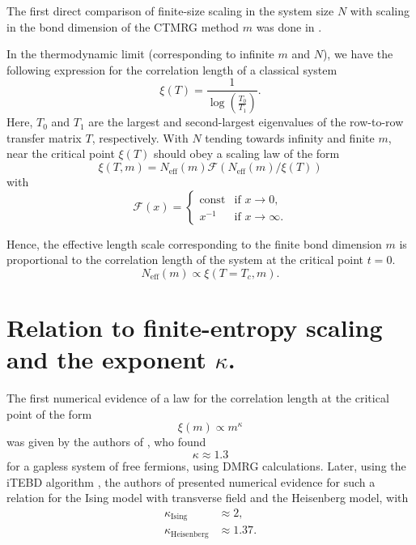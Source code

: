 The first direct comparison of finite-size scaling in the system size $N$ with scaling in
the bond dimension of the CTMRG method $m$ was done
in \cite{nishino1996numerical}.

In the thermodynamic limit (corresponding to infinite $m$ and $N$), we have the following
expression for the correlation length of a classical system
\cite{baxter1982exactly_correlation_length}
\begin{equation}\label{eq:correlation_length_row_to_row_transfer_matrix}
  \xi(T) = \frac{1}{\log\left(\frac{T_0}{T_1}\right)}.
\end{equation}
Here, $T_0$ and $T_1$ are the largest and second-largest eigenvalues of the row-to-row
transfer matrix $T$, respectively. With $N$ tending towards infinity and finite $m$, near
the critical point $\xi(T)$ should obey a scaling law of the form
\begin{equation}
  \xi(T, m) = N_{\text{eff}}(m) \mathcal{F}(N_{\text{eff}}(m) / \xi(T))
\end{equation}
with
\begin{equation}
  \mathcal{F}(x) = \begin{cases}
      \text{const} & \text{if } x \to 0, \\
      x^{-1} & \text{if } x \to \infty.
    \end{cases}
\end{equation}

Hence, the effective length scale corresponding to the finite bond dimension $m$ is
proportional to the correlation length of the system at the critical point $t = 0$.
\begin{equation}
  N_{\text{eff}}(m) \propto \xi(T = T_c, m).
\end{equation}


\section{Relation to finite-entropy scaling and the exponent $\kappa$.}


The first numerical evidence of a law for the correlation length at the critical point of the form
\begin{equation}\label{eq:xi_propto_m_kappa}
  \xi(m) \propto m^{\kappa}
\end{equation}
was given by the authors of \cite{andersson1999density}, who found
\begin{equation}
  \kappa \approx 1.3
\end{equation}
for a gapless system of free fermions, using DMRG calculations. Later, using the iTEBD algorithm
\cite{vidal2007classical}, the authors of \cite{tagliacozzo2008scaling} presented numerical evidence for such a relation
for the Ising model with transverse field and the Heisenberg model, with
\begin{align}
  \kappa_{\text{Ising}} & \approx 2, \\
  \kappa_{\text{Heisenberg}} & \approx 1.37.
\end{align}

